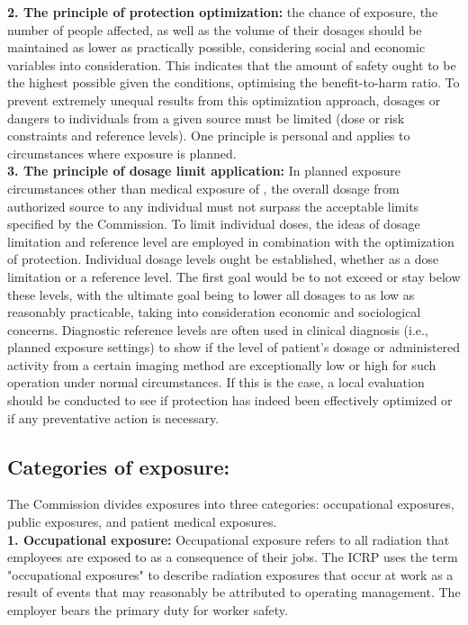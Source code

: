 \documentclass{article}
\begin{document}
\textbf{2.	The principle of protection optimization:} the chance of exposure, the number of people affected, as well as the volume of their dosages should be maintained as lower as practically possible, considering social and economic variables into consideration. This indicates that the amount of safety ought to be the highest possible given the conditions, optimising the benefit-to-harm ratio. To prevent extremely unequal results from this optimization approach, dosages or dangers to individuals from a given source must be limited (dose or risk constraints and reference levels). One principle is personal and applies to circumstances where exposure is planned. \\

\textbf{3.	The principle of dosage limit application:} In planned exposure circumstances other than medical exposure of , the overall dosage from authorized source to any individual must not surpass the acceptable limits specified by the Commission. To limit individual doses, the ideas of dosage limitation and reference level are employed in combination with the optimization of protection. Individual dosage levels ought be established, whether as a dose limitation or a reference level. The first goal would be to not exceed or stay below these levels, with the ultimate goal being to lower all dosages to as low as reasonably practicable, taking into consideration economic and sociological concerns. Diagnostic reference levels are often used in clinical diagnosis (i.e., planned exposure settings) to show if the level of patient’s dosage or administered activity from a certain imaging method are exceptionally low or high for such operation under normal circumstances. If this is the case, a local evaluation should be conducted to see if protection has indeed been effectively optimized or if any preventative action is necessary.


\subsection{Categories of exposure: }

The Commission divides exposures into three categories: occupational exposures, public exposures, and patient medical exposures. \\

\textbf{1.	Occupational exposure:} Occupational exposure refers to all radiation that employees are exposed to as a consequence of their jobs. The ICRP uses the term "occupational exposures" to describe radiation exposures that occur at work as a result of events that may reasonably be attributed to operating management. The employer bears the primary duty for worker safety. \\
\end{document}
